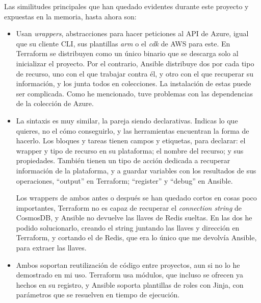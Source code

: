 \documentclass[11pt]{article}
\begin{document}
\begin{flushleft}
\clearpage
Las similitudes principales que han quedado evidentes durante este proyecto y expuestas en la memoria, hasta ahora son:
\skip
        \begin{itemize}
			\itemsep0em 
			\item Usan \textit{\gls{wrapper}s}, abstracciones para hacer peticiones al API de Azure, igual que su cliente CLI, sus plantillas \textit{\acrshort{arm}} o el \textit{\acrshort{cdk}} de AWS para este. En Terraform se distribuyen como un único binario que se descarga solo al inicializar el proyecto. Por el contrario, Ansible distribuye dos por cada tipo de recurso, uno con el que trabajar contra él, y otro con el que recuperar su información, y los junta todos en colecciones. La instalación de estas puede ser complicada. Como he mencionado, tuve problemas con las dependencias de la colección de Azure.
            \linebreak
            
			\item La sintaxis es muy similar, la pareja siendo declarativas. Indicas lo que quieres, no el cómo conseguirlo, y las herramientas encuentran la forma de hacerlo. Los bloques y tareas tienen campos y etiquetas, para declarar: el wrapper y tipo de recurso en su plataforma; el nombre del recurso; y sus propiedades. También tienen un tipo de acción dedicada a recuperar información de la plataforma, y a guardar variables con los resultados de sus operaciones, ``output'' en Terraform; ``register'' y ``debug'' en Ansible.
            \linebreak
            
            Los wrappers de ambos antes o después se han quedado cortos en cosas poco importantes, Terraform no es capaz de recuperar el \textit{connection string} de CosmosDB, y Ansible no devuelve las llaves de Redis sueltas. En las dos he podido solucionarlo, creando el string juntando las llaves y dirección en Terraform, y cortando el de Redis, que era lo único que me devolvía Ansible, para extraer las llaves.
            \linebreak
            
			\item Ambos soportan reutilización de código entre proyectos, aun si no lo he demostrado en mi uso. Terraform usa módulos, que incluso se ofrecen ya hechos en su registro, y Ansible soporta plantillas de roles con Jinja, con parámetros que se resuelven en tiempo de ejecución.
            \linebreak
   

\end{itemize}
\end{flushleft}
\end{document}
